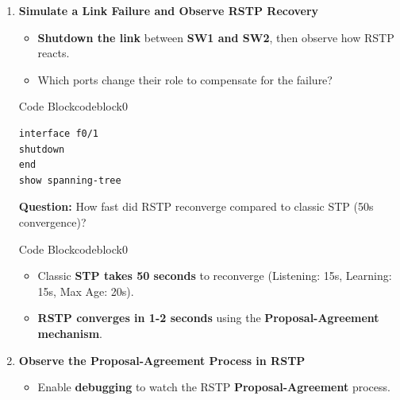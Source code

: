 \documentclass[a4paper]{book}
\begin{document}
\begin{enumerate}
	\item \textbf{Simulate a Link Failure and Observe RSTP Recovery}
	      \begin{itemize}
		      \item \textbf{Shutdown the link} between \textbf{SW1 and SW2}, then observe how RSTP reacts.
		      \item Which ports change their role to compensate for the failure?
	      \end{itemize}


	      \begin{ocg}{Code Block}{codeblock}{0}
		      \vspace{0.5cm}
		      \begin{lstlisting}
interface f0/1
shutdown
end
show spanning-tree
 \end{lstlisting}
	      \end{ocg}

	      \textbf{Question:} How fast did RSTP reconverge compared to classic STP (50s convergence)?



	      \begin{ocg}{Code Block}{codeblock}{0}
		      \vspace{0.5cm}
		      \begin{itemize}
			      \item Classic \textbf{STP takes 50 seconds} to reconverge (Listening: 15s, Learning: 15s, Max Age: 20s).
			      \item \textbf{RSTP converges in 1-2 seconds} using the \textbf{Proposal-Agreement mechanism}.
		      \end{itemize}
	      \end{ocg}



	\item \textbf{Observe the Proposal-Agreement Process in RSTP}
	      \begin{itemize}
		      \item Enable \textbf{debugging} to watch the RSTP \textbf{Proposal-Agreement} process.
	      \end{itemize}


\end{enumerate}
\end{document}
